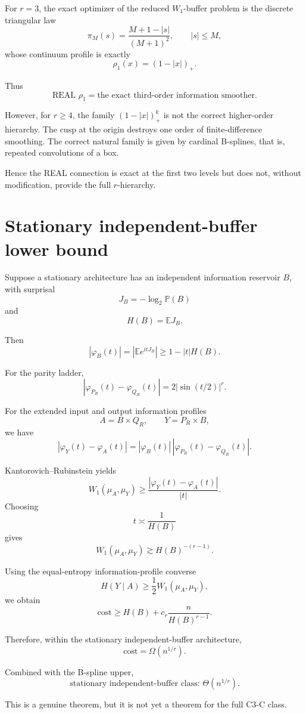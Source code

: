 \documentclass[11pt,a4paper]{article}
\newcommand{\E}{\mathbb E}
\newcommand{\PP}{\mathbb P}
\begin{document}
For \(r=3\), the exact optimizer of the reduced \(W_1\)-buffer problem is
the discrete triangular law
\[
\pi_M(s)
=
\frac{M+1-|s|}{(M+1)^2},
\qquad |s|\le M,
\]
whose continuum profile is exactly
\[
\rho_1(x)=(1-|x|)_+.
\]

Thus
\[
\boxed{
\text{REAL }\rho_1
=
\text{the exact third-order information smoother.}
}
\]

However, for \(r\ge4\), the family \((1-|x|)^k_+\) is not the correct
higher-order hierarchy.  The cusp at the origin destroys one order of
finite-difference smoothing.  The correct natural family is given by
cardinal B-splines, that is, repeated convolutions of a box.

Hence the REAL connection is exact at the first two levels but does not,
without modification, provide the full \(r\)-hierarchy.

\section{Stationary independent-buffer lower bound}

Suppose a stationary architecture has an independent information reservoir
\(B\), with surprisal
\[
J_B=-\log_2\PP(B)
\]
and
\[
H(B)=\E J_B.
\]

Then
\[
|\varphi_B(t)|
=
|\E e^{itJ_B}|
\ge
1-|t|H(B).
\]

For the parity ladder,
\[
\boxed{
|\varphi_{P_R}(t)-\varphi_{Q_R}(t)|
=
2|\sin(t/2)|^r.
}
\]

For the extended input and output information profiles
\[
A=B\times Q_R,
\qquad
Y=P_R\times B,
\]
we have
\[
|\varphi_Y(t)-\varphi_A(t)|
=
|\varphi_B(t)|
\,
|\varphi_{P_R}(t)-\varphi_{Q_R}(t)|.
\]

Kantorovich--Rubinstein yields
\[
W_1(\mu_A,\mu_Y)
\ge
\frac{
|\varphi_Y(t)-\varphi_A(t)|
}{|t|}.
\]
Choosing
\[
t\asymp \frac1{H(B)}
\]
gives
\[
W_1(\mu_A,\mu_Y)
\gtrsim
H(B)^{-(r-1)}.
\]

Using the equal-entropy information-profile converse
\[
H(Y\mid A)
\ge
\frac12W_1(\mu_A,\mu_Y),
\]
we obtain
\[
\text{cost}
\ge
H(B)
+
c_r
\frac n{H(B)^{r-1}}.
\]

Therefore, within the stationary independent-buffer architecture,
\[
\boxed{
\text{cost}=\Omega(n^{1/r}).
}
\]

Combined with the B-spline upper,
\[
\boxed{
\text{stationary independent-buffer class: }
\Theta(n^{1/r}).
}
\]

This is a genuine theorem, but it is not yet a theorem for the full C3-C
class.
\end{document}
